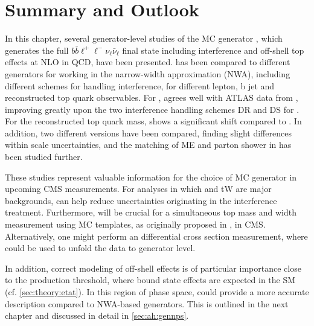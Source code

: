 \section{Summary and Outlook}

In this chapter, several generator-level studies of the MC generator \bbfourl, which generates the full $b \bar{b} \ell^+ \ell^- \nu_{\ell} \bar{\nu}_{\ell}$ final state including \tttW interference and off-shell top effects at NLO in QCD, have been presented. \bbfourl has been compared to different generators for \tttWsum working in the narrow-width approximation (NWA), including different schemes for handling \tttW interference, for different lepton, b jet and reconstructed top quark observables. For \mblminimax, \bbfourl agrees well with ATLAS data from , improving greatly upon the two interference handling schemes DR and DS for \tttWsum. For the reconstructed top quark mass, \bbfourl shows a significant shift compared to \tttWsum. In addition, two different \bbfourl versions have been compared, finding slight differences within scale uncertainties, and the matching of ME and parton shower in \bbfourl has been studied further.

These studies represent valuable information for the choice of \ttbar MC generator in upcoming CMS measurements. For analyses in which \ttbar and tW are major backgrounds, \bbfourl can help reduce uncertainties originating in the \tttW interference treatment.%
Furthermore, \bbfourl will be crucial for a simultaneous top mass and width measurement using MC templates, as originally proposed in , in CMS. Alternatively, one might perform an differential \tttWsum cross section measurement, where \bbfourl could be used to unfold the data to generator level. 

In addition, correct modeling of off-shell effects is of particular importance close to the \ttbar production threshold, where \ttbar bound state effects are expected in the SM (cf. \cref{sec:theory:etat}). In this region of phase space, \bbfourl could provide a more accurate description compared to NWA-based generators. This is outlined in the next chapter and discussed in detail in \cref{sec:ah:gennps}.